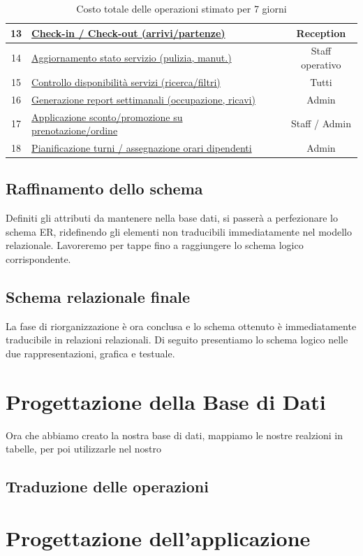 \documentclass[a4paper,12pt]{report}
\begin{document}
\begin{table}[H]
\begin{tabularx}{\textwidth}{|c|>{\raggedright\arraybackslash}X|c|c|}
		\hline
		13          & \hyperref[op13]{Check-in / Check-out (arrivi/partenze)}                &                           & Reception              \\
		\hline
		14          & \hyperref[op14]{Aggiornamento stato servizio (pulizia, manut.)}        &                           & Staff operativo        \\
		\hline
		15          & \hyperref[op15]{Controllo disponibilità servizi (ricerca/filtri)}      &                           & Tutti                  \\
		\hline
		16          & \hyperref[op16]{Generazione report settimanali (occupazione, ricavi)}  &                           & Admin                  \\
		\hline
		17          & \hyperref[op17]{Applicazione sconto/promozione su prenotazione/ordine} &                           & Staff / Admin          \\
		\hline
		18          & \hyperref[op18]{Pianificazione turni / assegnazione orari dipendenti}  &                           & Admin                  \\
		\hline
	\end{tabularx}
	\caption{Costo totale delle operazioni stimato per 7 giorni}
	\label{tab:riepilogo-operazioni-settimanali}
\end{table}

\section{Raffinamento dello schema}
Definiti gli attributi da mantenere nella base dati, si passerà a perfezionare lo schema ER, ridefinendo gli elementi non
traducibili immediatamente nel modello relazionale. Lavoreremo per tappe fino a raggiungere lo schema logico corrispondente.

\section{Schema relazionale finale}
La fase di riorganizzazione è ora conclusa e lo schema ottenuto è immediatamente traducibile
in relazioni relazionali. Di seguito presentiamo lo schema logico nelle due rappresentazioni, grafica e testuale.

\chapter{Progettazione della Base di Dati}
Ora che abbiamo creato la nostra base di dati, mappiamo le nostre realzioni in tabelle, per poi utilizzarle nel nostro

\section{Traduzione delle operazioni}

\chapter{Progettazione dell'applicazione}
\end{document}
